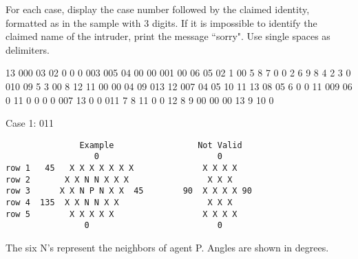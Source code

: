 \documentclass{article}
\begin{document}
\begin{outputDescription}
For each case, display the case number followed by the claimed identity, 
formatted as in the sample with 3 digits.   If it is impossible to identify 
the claimed name of the intruder, print the message ``sorry".  Use single 
spaces as delimiters.
\end{outputDescription}

\begin{sampleInput}
13
000  03  02  0  0  0
003  005 04  00 00 001
00   06  05  02 1  00
5  8  7  0  0  2
6  9  8  4  2  3
0 010 09  5  3  00
8  12  11  00  00  04
09 013 12  007 04  05
10  11 13  08  05  6
0  0  11  009  06  0
11 0  0  0  0  007
13 0  0  011  7  8
11  0  0  12  8  9
00 00 00 13  9  10
0
\end{sampleInput}
\begin{sampleOutput}
Case 1: 011
\end{sampleOutput}

\begin{verbatim}
               Example                 Not Valid
                  0                        0
row 1   45   X X X X X X X              X X X X
row 2       X X N N X X X                X X X
row 3      X X N P N X X  45        90  X X X X 90
row 4  135  X X N N X X                  X X X
row 5        X X X X X                  X X X X
                0                          0
\end{verbatim}
The six N's represent the neighbors of agent P.  Angles are shown in degrees.
\end{document}
